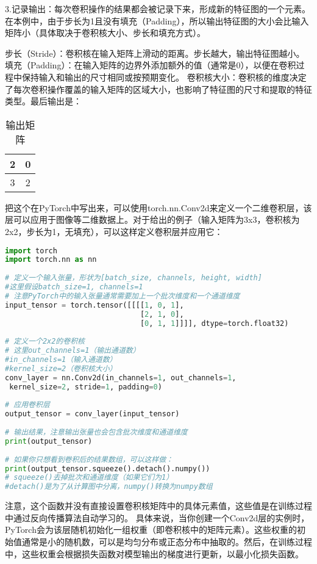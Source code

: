 3.记录输出：每次卷积操作的结果都会被记录下来，形成新的特征图的一个元素。在本例中，由于步长为1且没有填充（Padding），所以输出特征图的大小会比输入矩阵小（具体取决于卷积核大小、步长和填充方式）。

步长（Stride）：卷积核在输入矩阵上滑动的距离。步长越大，输出特征图越小。
填充（Padding）：在输入矩阵的边界外添加额外的值（通常是0），以便在卷积过程中保持输入和输出的尺寸相同或按预期变化。
卷积核大小：卷积核的维度决定了每次卷积操作覆盖的输入矩阵的区域大小，也影响了特征图的尺寸和提取的特征类型。
​
最后输出是：\begin{table}[ht]
\centering
\caption{输出矩阵}\label{tab_CNN24}
\begin{tabular}{|c|c|}
\hline
2 & 0 \\
\hline
3 & 2 \\
\hline
\end{tabular}
\end{table}

把这个在PyTorch中写出来，可以使用torch.nn.Conv2d来定义一个二维卷积层，该层可以应用于图像等二维数据上。对于给出的例子（输入矩阵为3x3，卷积核为2x2，步长为1，无填充），可以这样定义卷积层并应用它：


\begin{lstlisting}[language=python]
import torch  
import torch.nn as nn  
  
# 定义一个输入张量，形状为[batch_size, channels, height, width]
#这里假设batch_size=1, channels=1  
# 注意PyTorch中的输入张量通常需要加上一个批次维度和一个通道维度  
input_tensor = torch.tensor([[[[1, 0, 1],  
                               [2, 1, 0],  
                               [0, 1, 1]]]], dtype=torch.float32)  
  
# 定义一个2x2的卷积核
# 这里out_channels=1（输出通道数）
#in_channels=1（输入通道数）
#kernel_size=2（卷积核大小）  
conv_layer = nn.Conv2d(in_channels=1, out_channels=1,
 kernel_size=2, stride=1, padding=0)  
  
# 应用卷积层  
output_tensor = conv_layer(input_tensor)  
  
# 输出结果，注意输出张量也会包含批次维度和通道维度  
print(output_tensor)  
  
# 如果你只想看到卷积后的结果数组，可以这样做：  
print(output_tensor.squeeze().detach().numpy())  
# squeeze()去掉批次和通道维度（如果它们为1）
#detach()是为了从计算图中分离，numpy()转换为numpy数组
\end{lstlisting}

注意，这个函数并没有直接设置卷积核矩阵中的具体元素值，这些值是在训练过程中通过反向传播算法自动学习的。
具体来说，当你创建一个Conv2d层的实例时，PyTorch会为该层随机初始化一组权重（即卷积核中的矩阵元素）。这些权重的初始值通常是小的随机数，可以是均匀分布或正态分布中抽取的。然后，在训练过程中，这些权重会根据损失函数对模型输出的梯度进行更新，以最小化损失函数。